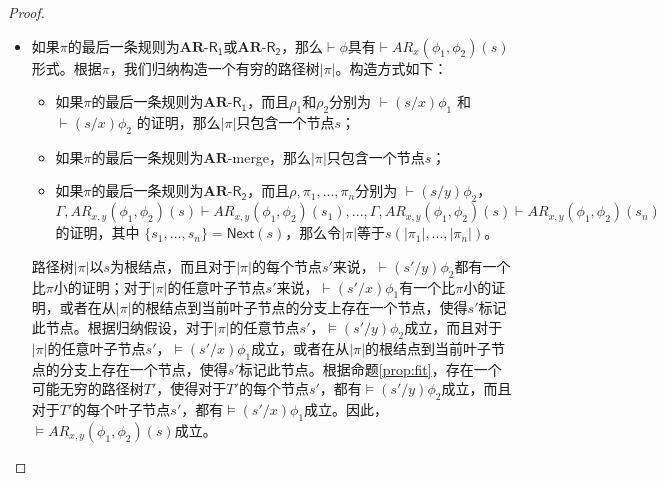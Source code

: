 \begin{proof}
\begin{itemize}
		
		\item 如果$\pi$的最后一条规则为$\mathbf{AR}$-$\mathsf{R_1}$或$\mathbf{AR}$-$\mathsf{R_2}$，那么$\vdash \phi$具有$\vdash AR_x(\phi_1,\phi_2)(s)$形式。根据$\pi$，我们归纳构造一个有穷的路径树$|\pi|$。构造方式如下：
		\begin{itemize}
			
			\item 如果$\pi$的最后一条规则为$\mathbf{AR}$-$\mathsf{R_1}$，而且$\rho_1$和$\rho_2$分别为 $\vdash (s/x)\phi_1$ 和 $\vdash (s/x)\phi_2$ 的证明，那么$|\pi|$只包含一个节点$s$；
			\item 如果$\pi$的最后一条规则为$\mathbf{AR}$-merge，那么$|\pi|$只包含一个节点$s$；
			
			
			
			\item 如果$\pi$的最后一条规则为$\mathbf{AR}$-$\mathsf{R_2}$，而且$\rho, \pi_1,...,\pi_n$分别为 $\vdash (s/y)\phi_2$， $\Gamma, AR_{x,y}(\phi_1, \phi_2)(s) \vdash AR_{x,y}(\phi_1, \phi_2)(s_1),...,\Gamma, AR_{x,y}(\phi_1, \phi_2)(s)\vdash AR_{x,y}(\phi_1, \phi_2)(s_n)$ 的证明，其中 $\{s_1,...,s_n\}=\mathsf{Next}(s)$，那么令$|\pi|$等于$s(|\pi_1|, ..., |\pi_n|)$。
			
		\end{itemize}
		路径树$|\pi|$以$s$为根结点，而且对于$|\pi|$的每个节点$s'$来说，$\vdash (s'/y)\phi_2$都有一个比$\pi$小的证明；对于$|\pi|$的任意叶子节点$s'$来说，$\vdash (s'/x)\phi_1$有一个比$\pi$小的证明，或者在从$|\pi|$的根结点到当前叶子节点的分支上存在一个节点，使得$s'$标记此节点。根据归纳假设，对于$|\pi|$的任意节点$s'$，$\models (s'/y)\phi_2$成立，而且对于$|\pi|$的任意叶子节点$s'$，$\models (s'/x)\phi_1$成立，或者在从$|\pi|$的根结点到当前叶子节点的分支上存在一个节点，使得$s'$标记此节点。根据命题\ref{prop:fit}，存在一个可能无穷的路径树$T'$，使得对于$T'$的每个节点$s'$，都有$\models (s'/y)\phi_2$成立，而且对于$T'$的每个叶子节点$s'$，都有$\models (s'/x)\phi_1$成立。因此，$\models AR_{x,y}(\phi_1, \phi_2)(s)$成立。
		

\end{itemize}
\end{proof}
